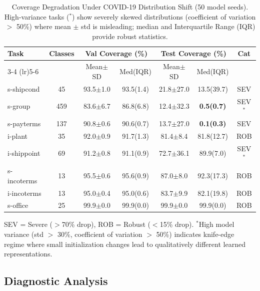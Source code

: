 \documentclass[sigconf]{acmart}
\begin{document}
\begin{table}[t]
\centering
\caption{Coverage Degradation Under COVID-19 Distribution Shift (50 model seeds).
High-variance tasks ($^*$) show severely skewed distributions (coefficient of variation $>$ 50\%) where mean $\pm$ std
is misleading; median and Interquartile Range (IQR) provide robust statistics.}
\label{tab:main_results}
\small
\begin{tabular}{@{}lcccccc@{}}
\toprule
\multirow{2}{*}{Task} & \multirow{2}{*}{Classes} &
\multicolumn{2}{c}{Val Coverage (\%)} &
\multicolumn{2}{c}{Test Coverage (\%)} &
\multirow{2}{*}{Cat} \\
\cmidrule(lr){3-4} \cmidrule(lr){5-6}
& & Mean$\pm$SD & Med(IQR) & Mean$\pm$SD & Med(IQR) & \\
\midrule
s-shipcond   & 45  & 93.5$\pm$1.0  & 93.5(1.4)  & 21.8$\pm$27.0 & 13.5(39.7) & SEV   \\
s-group      & 459 & 83.6$\pm$6.7  & 86.8(6.8)  & 12.4$\pm$32.3 & \textbf{0.5(0.7)}   & SEV$^*$ \\
s-payterms   & 137 & 90.8$\pm$0.6  & 90.6(0.7)  & 13.7$\pm$27.0 & \textbf{0.1(0.3)}   & SEV   \\
i-plant      & 35  & 92.0$\pm$0.9  & 91.7(1.3)  & 81.4$\pm$8.4  & 81.8(12.7) & ROB   \\
i-shippoint  & 69  & 91.2$\pm$0.8  & 91.1(0.9)  & 72.7$\pm$36.1 & 89.9(7.0)  & SEV$^*$ \\
s-incoterms  & 13  & 95.5$\pm$0.6  & 95.6(0.9)  & 87.0$\pm$8.0  & 92.3(17.3) & ROB   \\
i-incoterms  & 13  & 95.0$\pm$0.4  & 95.0(0.6)  & 83.7$\pm$9.9  & 82.1(19.8) & ROB   \\
s-office     & 25  & 99.9$\pm$0.0  & 99.9(0.0)  & 99.9$\pm$0.0  & 99.9(0.0)  & ROB   \\
\bottomrule
\end{tabular}
\vspace{2mm}

\raggedright
\footnotesize
SEV = Severe ($>$70\% drop), ROB = Robust ($<$15\% drop).
$^*$High model variance (std $>$ 30\%, coefficient of variation $>$ 50\%) indicates knife-edge regime where small
initialization changes lead to qualitatively different learned representations.
\end{table}

\subsection{Diagnostic Analysis}
\end{document}
